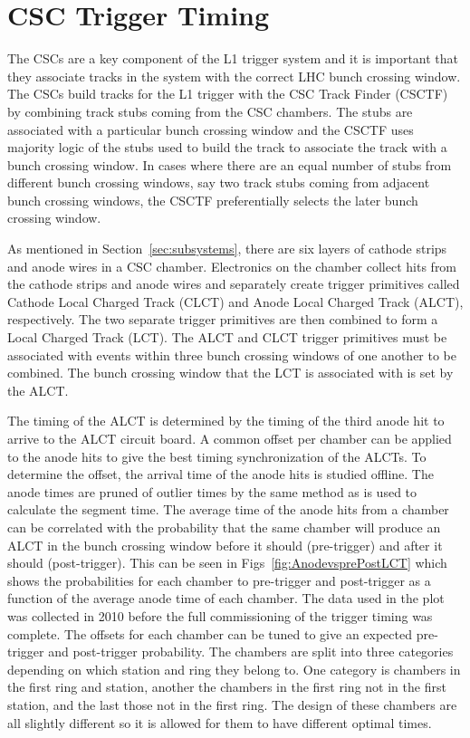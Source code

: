 \section{CSC Trigger Timing \label{sec:trigtime}}

The CSCs are a key component of the L1 trigger system and it is important that they associate tracks in the system with the correct LHC bunch crossing window.
The CSCs build tracks for the L1 trigger with the CSC Track Finder (CSCTF)~\cite{Chatrchyan:2009ab} by combining track stubs coming from the CSC chambers. 
The stubs are associated with a particular bunch crossing window and
the CSCTF uses majority logic of the stubs used to build the track to associate the track with a bunch crossing window. In cases where there are an equal number
of stubs from different bunch crossing windows, say two track stubs coming from adjacent bunch crossing windows, the CSCTF preferentially selects the later bunch crossing window.

As mentioned in Section~\ref{sec:subsystems}, there are six layers of cathode strips and anode wires in a CSC chamber.
Electronics on the chamber collect hits from the cathode strips and anode wires and separately create trigger primitives called Cathode Local Charged Track (CLCT)
and Anode Local Charged Track (ALCT), respectively. The two separate trigger primitives are then combined to form a Local Charged Track (LCT). The ALCT and CLCT trigger primitives
must be associated with events within three bunch crossing windows of one another to be combined.
The bunch crossing window that the LCT is associated with is set by the ALCT.

The timing of the ALCT is determined by the timing of the third anode hit 
to arrive to the ALCT circuit board. A common offset per chamber can be applied to the
anode hits to give the best timing synchronization of the ALCTs. To determine the offset, the arrival time of the anode hits is studied offline.
The anode times are pruned of outlier times by the same method as is used to calculate the segment time.
The average time of the anode
hits from a chamber can be correlated with the probability that the same chamber will produce an ALCT in the bunch crossing 
window before it should (pre-trigger) and after it should (post-trigger).
This can be seen in Figs~\ref{fig:AnodevsprePostLCT} which shows the probabilities for each chamber to pre-trigger and post-trigger as a function of the average
anode time of each chamber. The data used in the plot was collected in 2010 before the full commissioning of the trigger timing was complete.
The offsets for each chamber can be tuned to give an expected pre-trigger and post-trigger probability.
The chambers are split into three categories depending on which station and ring they belong to. One category is chambers in the
first ring and station, another the chambers in the first ring not in the first station, and the last those not in the first ring. The design of these chambers are all
slightly different so it is allowed for them to have different optimal times.

